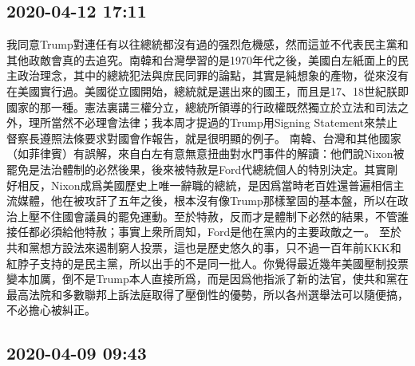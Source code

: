 \documentclass[twocolumn]{ctexart}
\begin{document}
\subsection*{2020-04-12 17:11}

我同意Trump對連任有以往總統都沒有過的强烈危機感，然而這並不代表民主黨和其他政敵會真的去追究。南韓和台灣學習的是1970年代之後，美國白左紙面上的民主政治理念，其中的總統犯法與庶民同罪的論點，其實是純想象的產物，從來沒有在美國實行過。美國從立國開始，總統就是選出來的國王，而且是17、18世紀朕即國家的那一種。憲法裏講三權分立，總統所領導的行政權既然獨立於立法和司法之外，理所當然不必理會法律；我本周才提過的Trump用Signing Statement來禁止督察長遵照法條要求對國會作報告，就是很明顯的例子。
南韓、台灣和其他國家（如菲律賓）有誤解，來自白左有意無意扭曲對水門事件的解讀：他們說Nixon被罷免是法治體制的必然後果，後來被特赦是Ford代總統個人的特別決定。其實剛好相反，Nixon成爲美國歷史上唯一辭職的總統，是因爲當時老百姓還普遍相信主流媒體，他在被攻訐了五年之後，根本沒有像Trump那樣鞏固的基本盤，所以在政治上壓不住國會議員的罷免運動。至於特赦，反而才是體制下必然的結果，不管誰接任都必須給他特赦；事實上衆所周知，Ford是他在黨内的主要政敵之一。
至於共和黨想方設法來遏制窮人投票，這也是歷史悠久的事，只不過一百年前KKK和紅脖子支持的是民主黨，所以出手的不是同一批人。你覺得最近幾年美國壓制投票變本加厲，倒不是Trump本人直接所爲，而是因爲他指派了新的法官，使共和黨在最高法院和多數聯邦上訴法庭取得了壓倒性的優勢，所以各州選舉法可以隨便搞，不必擔心被糾正。
\subsection*{2020-04-09 09:43}
\end{document}
